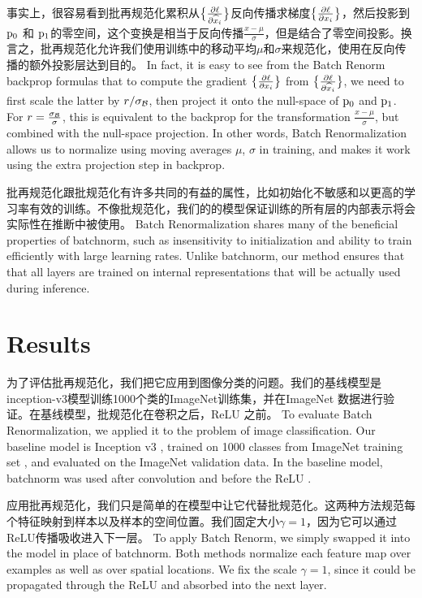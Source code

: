 事实上，很容易看到批再规范化累积从$\big\{\frac{\partial \ell}{\partial \widehat{x}_i}\big\}$反向传播求梯度$\big\{\frac{\partial \ell}{\partial x_i}\big\}$，然后投影到$\mathrm{p}_0$ 和 $\mathrm{p}_1$的零空间，这个变换是相当于反向传播$\frac{x-\mu}{\sigma}$，但是结合了零空间投影。换言之，批再规范化允许我们使用训练中的移动平均$\mu$和$\sigma$来规范化，使用在反向传播的额外投影层达到目的。
In fact, it is easy to see from the Batch Renorm backprop formulas that to compute the gradient $\big\{\frac{\partial \ell}{\partial x_i}\big\}$ from  $\big\{\frac{\partial \ell}{\partial \widehat{x}_i}\big\}$, we need to first scale the latter by $r/\sigma_{\mathcal{B}}$, then project it onto the null-space of $\mathrm{p}_0$ and $\mathrm{p}_1$. For $r=\frac{\sigma_{\mathcal{B}}}{\sigma}$, this is equivalent to the backprop for the transformation $\frac{x-\mu}{\sigma}$, but combined with the null-space projection. In other words, Batch Renormalization allows us to normalize using moving averages $\mu$, $\sigma$ in training, and makes it work using the extra projection step in backprop.

批再规范化跟批规范化有许多共同的有益的属性，比如初始化不敏感和以更高的学习率有效的训练。不像批规范化，我们的的模型保证训练的所有层的内部表示将会实际性在推断中被使用。
Batch Renormalization shares many of the beneficial properties of batchnorm, such as insensitivity to initialization and ability to train efficiently with large learning rates. Unlike batchnorm, our method ensures that that all layers are trained on internal representations that will be actually used during inference.


\section{Results}
为了评估批再规范化，我们把它应用到图像分类的问题。我们的基线模型是inception-v3模型训练1000个类的ImageNet训练集，并在ImageNet 数据进行验证。在基线模型，批规范化在卷积之后，ReLU 之前。
To evaluate Batch Renormalization, we applied it to the problem of image classification. Our baseline model is Inception v3 \cite{inception-v3}, trained on 1000 classes from ImageNet training set \cite{imagenet}, and evaluated on the ImageNet validation data. In the baseline model, batchnorm was used after convolution and before the ReLU \cite{relu}.

应用批再规范化，我们只是简单的在模型中让它代替批规范化。这两种方法规范每个特征映射到样本以及样本的空间位置。我们固定大小$\gamma=1$，因为它可以通过ReLU传播吸收进入下一层。
To apply Batch Renorm, we simply swapped it into the model in place of batchnorm. Both methods normalize each feature map over examples as well as over spatial locations. We fix the scale $\gamma=1$, since it could be propagated through the ReLU and absorbed into the next layer.

